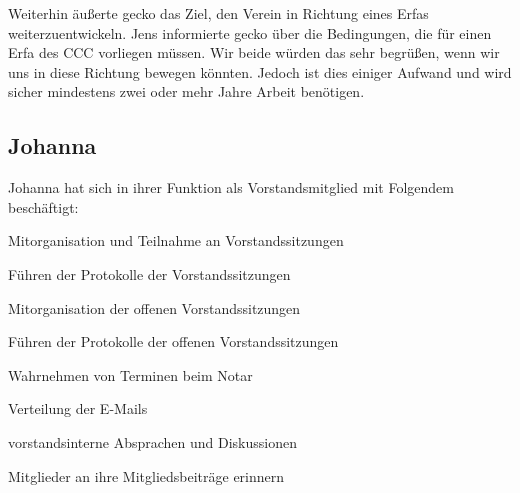 \documentclass[ngerman]{scrartcl}
\begin{document}
Weiterhin äußerte gecko das Ziel, den Verein in Richtung eines Erfas
weiterzuentwickeln. Jens informierte gecko über die Bedingungen, die für einen
Erfa des CCC vorliegen müssen. Wir beide würden das sehr begrüßen, wenn wir uns
in diese Richtung bewegen könnten. Jedoch ist dies einiger Aufwand und wird
sicher mindestens zwei oder mehr Jahre Arbeit benötigen.

\subsection{Johanna}

Johanna hat sich in ihrer Funktion als Vorstandsmitglied mit Folgendem 
beschäftigt:

\begin{compactitem}
    \item Mitorganisation und Teilnahme an Vorstandssitzungen
    \item Führen der Protokolle der Vorstandssitzungen
    \item Mitorganisation der offenen Vorstandssitzungen
    \item Führen der Protokolle der offenen Vorstandssitzungen
    \item Wahrnehmen von Terminen beim Notar
    \item Verteilung der E-Mails
    \item vorstandsinterne Absprachen und Diskussionen 
    \item Mitglieder an ihre Mitgliedsbeiträge erinnern
\end{compactitem}
\end{document}
